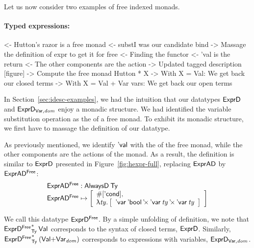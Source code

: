 Let us now consider two examples of free indexed monads.


\paragraph{Typed expressions:}

\begin{wstructure}
<- Hutton's razor is a free monad
    <- substI was our candidate bind
        -> Massage the definition of expr to get it for free
    <- Finding the functor
        <- 'val is the return
        <- The other components are the action
        -> Updated tagged description [figure]
    -> Compute the free monad Hutton * X
        -> With X = Val: We get back our closed terms
        -> With X = Val + Var vars: We get back our open terms
\end{wstructure}

In Section~\ref{sec:idesc-examples}, we had the intuition that our
datatypes $\HExprD$ and $\HExprVarD{\V{dom}}$ enjoy a monadic
structure. We had identified the variable substitution operation as
the \bind of a free monad. To exhibit its monadic structure, we first
have to massage the definition of our datatype.

As previously mentioned, we identify $\SYMBEval$ with the \return of
the free monad, while the other components are the actions of the
monad. As a result, the definition is similar to $\HExprD$ presented
in Figure~\ref{fig:hexpr-full}, replacing $\HExprAD$ by
$\HExprAFreeD$:
%
\[\stk{
\HExprAFreeD : \ATagIDesc{\Ty} \\
\HExprAFreeD \mapsto \bigRedBracket{
                 \begin{array}{l}
                   \EnumT{\sqr{\SYMBEcond}} \red{,} \\
                   \LAM{\V{ty}}
                   \bigRedBracket{
                   \begin{array}{l}
                   \DProd{\DVar{\Ebool}}{\DProd{\DVar{\V{ty}}}{\DVar{\V{ty}}}}
                   \end{array}
                   }
                 \end{array}
                 }
}\]

We call this datatype $\HExprFreeD$. By a simple unfolding of
definition, we note that $\FreeIMonad{\HExprFreeD}{\Ty}{\SYMBVal}$
corresponds to the syntax of closed terms, $\HExprD$. Similarly,
$\FreeIMonad{\HExprFreeD}{\Ty}{(\SUM{\SYMBVal}{\Var{\V{dom}}{}})}$
corresponds to expressions with variables, $\HExprVarD{\V{dom}}$.

